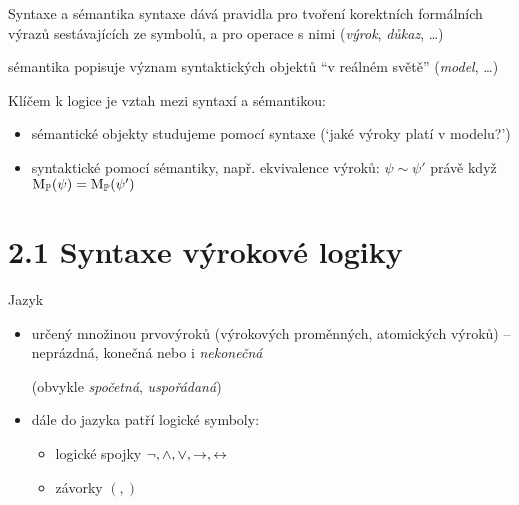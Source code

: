 \documentclass{beamer}
\begin{document}
\begin{frame}{Syntaxe a sémantika}
    \alert{syntaxe} dává pravidla pro tvoření korektních formálních výrazů sestávajících ze symbolů, a pro operace s nimi (\emph{výrok}, \emph{důkaz}, \dots)
    
    \alert{sémantika} popisuje význam syntaktických objektů ``v reálném světě'' (\emph{model}, \dots)
    
    \pause
    
    Klíčem k logice je \alert{vztah mezi syntaxí a sémantikou}:
    \begin{itemize}
        \item sémantické objekty studujeme pomocí syntaxe (`jaké výroky platí v modelu?')
        \item syntaktické pomocí sémantiky, např. ekvivalence výroků: $\psi \sim \psi'$ právě když $\operatorname{M}_\mathbb P(\psi)=\operatorname{M}_\mathbb P(\psi')$
    \end{itemize}
\end{frame}


\section{2.1 Syntaxe výrokové logiky}


\begin{frame}{Jazyk}
    \begin{itemize}
        \item určený množinou \alert{prvovýroků} (\alert{výrokových proměnných}, \alert{atomických výroků}) -- neprázdná, konečná nebo i \emph{nekonečná}
    
        \medskip
        \medskip
        
        (obvykle \emph{spočetná}, \emph{uspořádaná})
    
        \pause

        \medskip
        \item dále do jazyka patří \alert{logické symboly}:
        \begin{itemize}
            \item logické spojky $\neg,{\land},{\lor}, {\mathbin{\rightarrow}}, {\mathbin{\leftrightarrow}}$
            \item závorky $(,)$
        \end{itemize}
    \end{itemize}
\end{frame}
\end{document}
